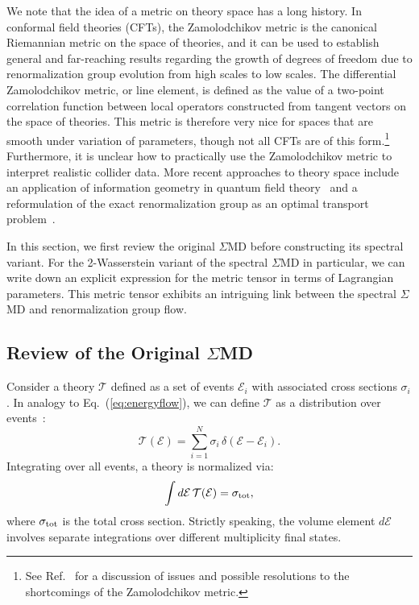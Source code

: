 \documentclass[letterpaper,11pt]{article}
\DeclareRobustCommand{\Eq}[1]{Eq.~(\ref{#1})}
\DeclareRobustCommand{\InRef}[1]{Ref.~\cite{#1}}
\begin{document}
We note that the idea of a metric on theory space has a long history.
%
In conformal field theories (CFTs), the Zamolodchikov metric \cite{Zamolodchikov:1986gt,Kutasov:1988xb} is the canonical Riemannian metric on the space of theories, and it can be used to establish general and far-reaching results regarding the growth of degrees of freedom due to renormalization group evolution from high scales to low scales.
%
The differential Zamolodchikov metric, or line element, is defined as the value of a two-point correlation function between local operators constructed from tangent vectors on the space of theories.
%
This metric is therefore very nice for spaces that are smooth under variation of parameters, though not all CFTs are of this form.\footnote{See \InRef{Douglas:2010ic} for a discussion of issues and possible resolutions to the shortcomings of the Zamolodchikov metric.}
%
Furthermore, it is unclear how to practically use the Zamolodchikov metric to interpret realistic collider data.
%
More recent approaches to theory space include an application of information geometry in quantum field theory~\cite{Erdmenger:2020vmo} and a reformulation of  the exact renormalization group \cite{Polchinski:1983gv} as an optimal transport problem~\cite{Cotler:2022fze}.


In this section, we first review the original $\Sigma$MD before constructing its spectral variant.
%
For the 2-Wasserstein variant of the spectral $\Sigma$MD in particular, we can write down an explicit expression for the metric tensor in terms of Lagrangian parameters.
%
This metric tensor exhibits an intriguing link between the spectral $\Sigma$MD and renormalization group flow.



\subsection{Review of the Original $\Sigma$MD}

Consider a theory $\mathcal{T}$ defined as a set of events $\mathcal{E}_i$ with associated cross sections $\sigma_i$.
%
In analogy to \Eq{eq:energyflow}, we can define $\mathcal{T}$ as a distribution over events~\cite{Komiske:2020qhg}:
%
\begin{equation}
\mathcal{T}(\mathcal{E}) = \sum_{i=1}^N \sigma_i \, \delta(\mathcal{E} - \mathcal{E}_i).
\end{equation}
%
Integrating over all events, a theory is normalized via:
%
\begin{equation}
\int d \mathcal{E} \, \mathcal{T}(\mathcal{E}) = \sigma_{\rm tot},
\end{equation}
%
where $\sigma_{\rm tot}$ is the total cross section.
%
Strictly speaking, the volume element $d \mathcal{E}$ involves separate integrations over different multiplicity final states.
\end{document}
